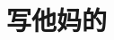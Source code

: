 \documentclass[lang=cn,11pt]{elegantpaper}
\title{写他妈的}
\date{}
\begin{document}
\maketitle


\nocite{*}



\end{document}
